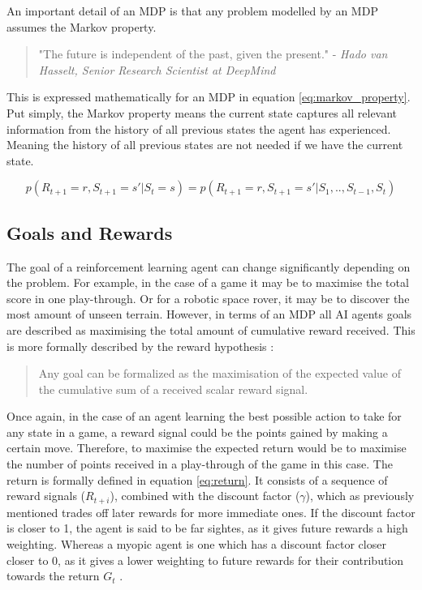 \documentclass[../dissertation.tex]{subfiles}
\begin{document}
\noindent
An important detail of an MDP  is that any problem modelled by an MDP assumes the Markov property.

\begin{quote}
"The future is independent of the past, given the present." - \textit{Hado van Hasselt, Senior Research Scientist at DeepMind} \cite{introToRL}
\end{quote}

This is expressed mathematically for an MDP in equation \ref{eq:markov_property}. Put simply, the Markov property means the current state captures all relevant information from the history of all previous states the agent has experienced. Meaning the history of all previous states are not needed if we have the current state.

\begin{equation}
\label{eq:markov_property}
p(R_{t+1} = r, S_{t+1} = s' | S_t = s) = p(R_{t+1} = r, S_{t+1} = s' | S_1, .. , S_{t-1}, S_{t})
\end{equation}

\subsection{Goals and Rewards}
The goal of a reinforcement learning agent can change significantly depending on the problem. For example, in the case of a game it may be to maximise the total score in one play-through. Or for a robotic space rover, it may be to discover the most amount of unseen terrain. However, in terms of an MDP all AI agents goals are described as maximising the total amount of cumulative reward received. This is more formally described by the reward hypothesis \cite{sutton2011reinforcement}:

\begin{quote}
Any goal can be formalized as the maximisation of the expected value of the cumulative sum of a received scalar reward signal.
\end{quote}

Once again, in the case of an agent learning the best possible action to take for any state in a game, a reward signal could be the points gained by making a certain move. Therefore, to maximise the expected return would be to maximise the number of points received in a play-through of the game in this case.  The return is formally defined in equation \ref{eq:return}. It consists of a sequence of reward signals ($R_{t+i}$), combined with the discount factor ($\gamma$), which as previously mentioned trades off later rewards for more immediate ones. If the discount factor is closer to 1, the agent is said to be far sightes, as it gives future rewards a high weighting. Whereas a myopic agent is one which has a discount factor closer closer to 0, as it gives a lower weighting to future rewards for their contribution towards the return $G_t$ \cite{introToRL}. 
\end{document}
